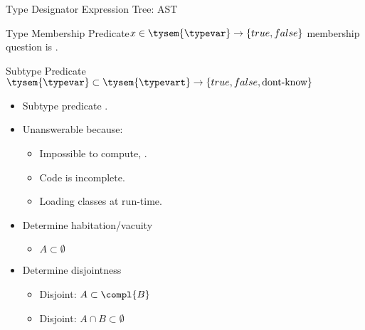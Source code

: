 \begin{frame}{Type Designator Expression Tree: AST}
  \centering

  \scalebox{0.95}{}

\end{frame}



\newsavebox\membershipbox
\begin{lrbox}{\membershipbox}
  \begin{minipage}{11cm}
    
  \end{minipage}
\end{lrbox}

\begin{frame}{Type Membership Predicate}{$x \in \tysem{\typevar} \to \{true, false\}$}
   membership question is .

  \usebox\membershipbox
\end{frame}

\newsavebox\subtypebox
\begin{lrbox}{\subtypebox}
  \begin{minipage}{11cm}

  \end{minipage}
\end{lrbox}



\begin{frame}{Subtype Predicate}{$\tysem{\typevar}\subset\tysem{\typevart} \to \{true,false,\text{dont-know}\}$}
  \begin{itemize}
    
  \item   {} Subtype predicate .
    
    \usebox\subtypebox
    
  \item Unanswerable because:
    \begin{itemize}
    \item Impossible to compute, \eg {}.
    \item Code is incomplete.
    \item Loading classes at run-time.
    \end{itemize}
    
  \item Determine habitation/vacuity
    \begin{itemize}
    \item $A \subset \emptyset$
    \end{itemize}

  \item Determine disjointness
    \begin{itemize}
    \item Disjoint:  $A \subset \compl{B}$
    \item Disjoint: $A\cap B \subset \emptyset$
    \end{itemize}
  \end{itemize}
  
\end{frame}

